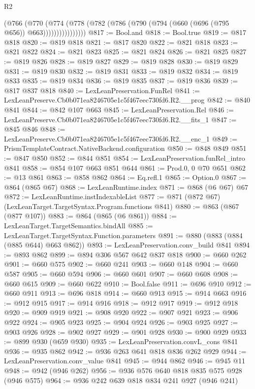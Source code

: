 \begin{lexlean}{R2}
\begin{coremodule}
                  (@766
                    (@770
                      (@774
                        (@778 (@782 (@786 (@790 (@794 (@660 (@696 (@795 @656)) @663))))))))))))))))
@817 := Bool.and
@818 := Bool.true
@819 := @817 @818
@820 := @819 @818
@821 := @817 @820
@822 := @821 @818
@823 := @821 @822
@824 := @821 @823
@825 := @821 @824
@826 := @821 @825
@827 := @819 @826
@828 := @819 @827
@829 := @819 @828
@830 := @819 @829
@831 := @819 @830
@832 := @819 @831
@833 := @819 @832
@834 := @819 @833
@835 := @819 @834
@836 := @819 @835
@837 := @819 @836
@839 := @817 @837 @818
@840 := LexLeanPreservation.FunRel
@841 := LexLeanPreserve.Cb0b071ea8246705e1c5f467eec730fd6.R2.__prog
@842 := @840 @841
@844 := @842 @107 @663
@845 := LexLeanPreservation.Rel
@846 := LexLeanPreserve.Cb0b071ea8246705e1c5f467eec730fd6.R2.__fits_1
@847 := @845 @846
@848 := LexLeanPreserve.Cb0b071ea8246705e1c5f467eec730fd6.R2.__enc_1
@849 := PrismTemplateContract.NativeBackend.configuration
@850 := @848 @849
@851 := @847 @850
@852 := @844 @851
@854 := LexLeanPreservation.funRel_intro @841
@858 := @854 @107 @663 @851 @644
@861 := Prod.{0, 0} @70 @651
@862 := @13 @861
@863 := @858 @862
@864 := Eq.refl.{1}
@865 := Option.{0}
@867 := @864 (@865 @67)
@868 := LexLeanRuntime.index
@871 := @868 (@6 @67) @67
@872 := LexLeanRuntime.instIndexableList
@877 := @871 (@872 @67) (LexLeanTarget.TargetSyntax.Program.functions @841)
@880 := @863 (@867 (@877 @107))
@883 := @864 (@865 (@6 @861))
@884 := LexLeanTarget.TargetSemantics.bindAll
@885 := LexLeanTarget.TargetSyntax.Function.parameters
@891 := @880 (@883 (@884 (@885 @644) @663 @862))
@893 := LexLeanPreservation.conv_build @841
@894 := @893 @862
@899 := @894 @306 @567 @642 @837 @818
@900 := @660 @262
@901 := @660 @575
@902 := @660 @241
@903 := @660 @148
@904 := @660 @587
@905 := @660 @594
@906 := @660 @601
@907 := @660 @608
@908 := @660 @615
@909 := @660 @622
@910 := Bool.false
@911 := @696 @910
@912 := @660 @911
@913 := @696 @818
@914 := @660 @913
@915 := @914 @663
@916 := @912 @915
@917 := @914 @916
@918 := @912 @917
@919 := @912 @918
@920 := @909 @919
@921 := @908 @920
@922 := @907 @921
@923 := @906 @922
@924 := @905 @923
@925 := @904 @924
@926 := @903 @925
@927 := @903 @926
@928 := @902 @927
@929 := @901 @928
@930 := @900 @929
@933 := @899 @930 (@659 @930)
@935 := LexLeanPreservation.convL_cons @841
@936 := @935 @862
@942 := @936 @263 @641 @818 @836 @262 @929
@944 := LexLeanPreservation.conv_value @841
@945 := @944 @862
@946 := @945 @11
@948 := @942 (@946 @262)
@956 := @936 @576 @640 @818 @835 @575 @928 (@946 @575)
@964 := @936 @242 @639 @818 @834 @241 @927 (@946 @241)

\end{coremodule}
\end{lexlean}
